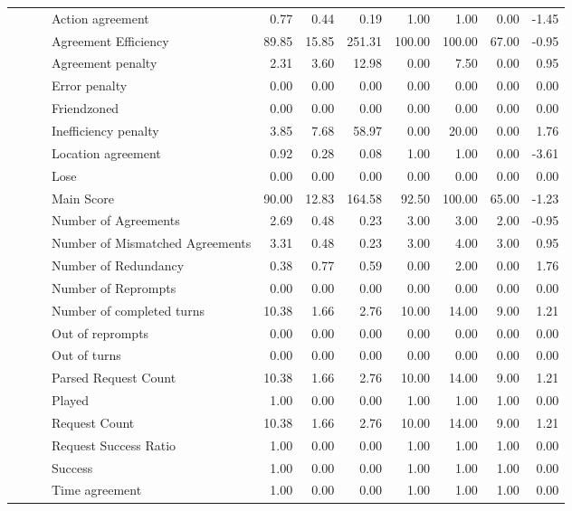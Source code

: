 \begin{tabular}{llllrrrrrrr}
 &  &  & Action agreement & 0.77 & 0.44 & 0.19 & 1.00 & 1.00 & 0.00 & -1.45 \\
 &  &  & Agreement Efficiency & 89.85 & 15.85 & 251.31 & 100.00 & 100.00 & 67.00 & -0.95 \\
 &  &  & Agreement penalty & 2.31 & 3.60 & 12.98 & 0.00 & 7.50 & 0.00 & 0.95 \\
 &  &  & Error penalty & 0.00 & 0.00 & 0.00 & 0.00 & 0.00 & 0.00 & 0.00 \\
 &  &  & Friendzoned & 0.00 & 0.00 & 0.00 & 0.00 & 0.00 & 0.00 & 0.00 \\
 &  &  & Inefficiency penalty & 3.85 & 7.68 & 58.97 & 0.00 & 20.00 & 0.00 & 1.76 \\
 &  &  & Location agreement & 0.92 & 0.28 & 0.08 & 1.00 & 1.00 & 0.00 & -3.61 \\
 &  &  & Lose & 0.00 & 0.00 & 0.00 & 0.00 & 0.00 & 0.00 & 0.00 \\
 &  &  & Main Score & 90.00 & 12.83 & 164.58 & 92.50 & 100.00 & 65.00 & -1.23 \\
 &  &  & Number of Agreements & 2.69 & 0.48 & 0.23 & 3.00 & 3.00 & 2.00 & -0.95 \\
 &  &  & Number of Mismatched Agreements & 3.31 & 0.48 & 0.23 & 3.00 & 4.00 & 3.00 & 0.95 \\
 &  &  & Number of Redundancy & 0.38 & 0.77 & 0.59 & 0.00 & 2.00 & 0.00 & 1.76 \\
 &  &  & Number of Reprompts & 0.00 & 0.00 & 0.00 & 0.00 & 0.00 & 0.00 & 0.00 \\
 &  &  & Number of completed turns & 10.38 & 1.66 & 2.76 & 10.00 & 14.00 & 9.00 & 1.21 \\
 &  &  & Out of reprompts & 0.00 & 0.00 & 0.00 & 0.00 & 0.00 & 0.00 & 0.00 \\
 &  &  & Out of turns & 0.00 & 0.00 & 0.00 & 0.00 & 0.00 & 0.00 & 0.00 \\
 &  &  & Parsed Request Count & 10.38 & 1.66 & 2.76 & 10.00 & 14.00 & 9.00 & 1.21 \\
 &  &  & Played & 1.00 & 0.00 & 0.00 & 1.00 & 1.00 & 1.00 & 0.00 \\
 &  &  & Request Count & 10.38 & 1.66 & 2.76 & 10.00 & 14.00 & 9.00 & 1.21 \\
 &  &  & Request Success Ratio & 1.00 & 0.00 & 0.00 & 1.00 & 1.00 & 1.00 & 0.00 \\
 &  &  & Success & 1.00 & 0.00 & 0.00 & 1.00 & 1.00 & 1.00 & 0.00 \\
 &  &  & Time agreement & 1.00 & 0.00 & 0.00 & 1.00 & 1.00 & 1.00 & 0.00 \\

\end{tabular}
